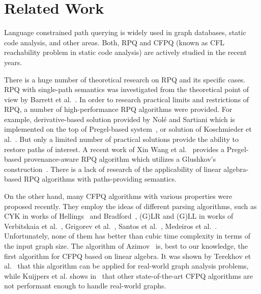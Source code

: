 \section{Related Work}

Language constrained path querying is widely used in graph databases, static code analysis, and other areas.
Both, RPQ and CFPQ (known as CFL reachability problem in static code analysis) are actively studied in the recent years.

There is a huge number of theoretical research on RPQ and its specific cases.
RPQ with single-path semantics was investigated from the theoretical point of view by Barrett et al.~\cite{barrett2000formal}.
In order to research practical limits and restrictions of RPQ, a number of high-performance RPQ algorithms were provided.
For example, derivative-based solution provided by Nol\'{e} and Sartiani which is implemented on the top of Pregel-based system~\cite{10.1145/2949689.2949711}, or solution of Koschmieder et al.~\cite{10.1007/978-3-642-31235-9_12}.
But only a limited number of practical solutions provide the ability to restore paths of interest.
A recent work of Xin Wang et al.~\cite{Wang2019} provides a Pregel-based provenance-aware RPQ algorithm which utilizes a Glushkov's construction~\cite{Glushkov1961}.
There is a lack of research of the applicability of linear algebra-based RPQ algorithms with paths-providing semantics.

On the other hand, many CFPQ algorithms with various properties were proposed recently.
They employ the ideas of different parsing algorithms, such as CYK in works of Hellings~\cite{hellingsRelational} and Bradford~\cite{8249039}, (G)LR and (G)LL in works of Verbitskaia et al.~\cite{10.1007/978-3-319-41579-6_22}, Grigorev et al.~\cite{Grigorev:2017:CPQ:3166094.3166104}, Santos et al.~\cite{10.1007/978-3-319-91662-0_17}, Medeiros et al.~\cite{Medeiros:2018:EEC:3167132.3167265}.
Unfortunately, none of them has better than cubic time complexity in terms of the input graph size.
The algorithm of Azimov~\cite{Azimov:2018:CPQ:3210259.3210264} is, best to our knowledge, the first algorithm for CFPQ based on linear algebra.
It was shown by Terekhov et al.~\cite{10.1145/3398682.3399163} that this algorithm can be applied for real-world graph analysis problems, while Kuijpers et al. shows in~\cite{Kuijpers:2019:ESC:3335783.3335791} that other state-of-the-art CFPQ algorithms are not performant enough to handle real-world graphs.

